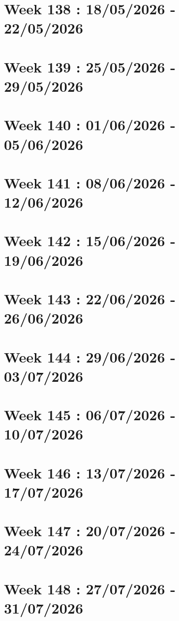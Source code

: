 \documentclass[french]{article}
\begin{document}
	\section{Week 138 : 18/05/2026 - 22/05/2026}

	\section{Week 139 : 25/05/2026 - 29/05/2026}

	\section{Week 140 : 01/06/2026 - 05/06/2026}

	\section{Week 141 : 08/06/2026 - 12/06/2026}

	\section{Week 142 : 15/06/2026 - 19/06/2026}

	\section{Week 143 : 22/06/2026 - 26/06/2026}

	\section{Week 144 : 29/06/2026 - 03/07/2026}

	\section{Week 145 : 06/07/2026 - 10/07/2026}

	\section{Week 146 : 13/07/2026 - 17/07/2026}

	\section{Week 147 : 20/07/2026 - 24/07/2026}

	\section{Week 148 : 27/07/2026 - 31/07/2026}
\end{document}
